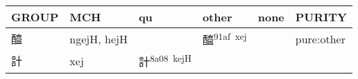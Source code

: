 \documentclass[14pt,a4paper]{scrartcl}
\begin{document}
\begin{longtable}[c]{@{}llllll@{}}
\toprule
\begin{minipage}[b]{0.14\columnwidth}\raggedright\strut
GROUP
\strut\end{minipage} &
\begin{minipage}[b]{0.14\columnwidth}\raggedright\strut
MCH
\strut\end{minipage} &
\begin{minipage}[b]{0.14\columnwidth}\raggedright\strut
qu
\strut\end{minipage} &
\begin{minipage}[b]{0.14\columnwidth}\raggedright\strut
other
\strut\end{minipage} &
\begin{minipage}[b]{0.14\columnwidth}\raggedright\strut
none
\strut\end{minipage} &
\begin{minipage}[b]{0.14\columnwidth}\raggedright\strut
PURITY
\strut\end{minipage}\tabularnewline
\midrule
\endhead
\begin{minipage}[t]{0.14\columnwidth}\raggedright\strut
醯
\strut\end{minipage} &
\begin{minipage}[t]{0.14\columnwidth}\raggedright\strut
ngejH, hejH
\strut\end{minipage} &
\begin{minipage}[t]{0.14\columnwidth}\raggedright\strut
\strut\end{minipage} &
\begin{minipage}[t]{0.14\columnwidth}\raggedright\strut
醯\textsuperscript{91af~xej}
\strut\end{minipage} &
\begin{minipage}[t]{0.14\columnwidth}\raggedright\strut
\strut\end{minipage} &
\begin{minipage}[t]{0.14\columnwidth}\raggedright\strut
pure:other
\strut\end{minipage}\tabularnewline
\begin{minipage}[t]{0.14\columnwidth}\raggedright\strut
計
\strut\end{minipage} &
\begin{minipage}[t]{0.14\columnwidth}\raggedright\strut
xej
\strut\end{minipage} &
\begin{minipage}[t]{0.14\columnwidth}\raggedright\strut
計\textsuperscript{8a08~kejH}
\strut\end{minipage} &

\end{longtable}
\end{document}
